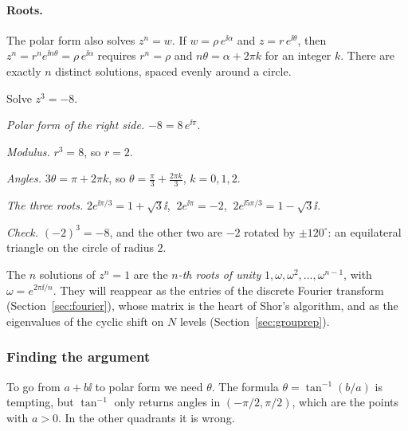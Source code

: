 \paragraph{Roots.} The polar form also solves $z^n=w$. If $w=\rho\,e^{\ii\alpha}$ and $z=r\,e^{\ii\theta}$, then $z^n=r^ne^{\ii n\theta}=\rho\,e^{\ii\alpha}$ requires $r^n=\rho$ and $n\theta=\alpha+2\pi k$ for an integer $k$. There are exactly $n$ distinct solutions, spaced evenly around a circle.

\begin{example}[Roots of $-8$]\label{ex:roots}
  Solve $z^3=-8$.
\end{example}
\begin{solution}
  \begin{steps}
    \item \emph{Polar form of the right side.} $-8=8\,e^{\ii\pi}$.
    \item \emph{Modulus.} $r^3=8$, so $r=2$.
    \item \emph{Angles.} $3\theta=\pi+2\pi k$, so $\theta=\frac\pi3+\frac{2\pi k}{3}$, $k=0,1,2$.
    \item \emph{The three roots.} $2e^{\ii\pi/3}=1+\sqrt3\ii$, $\ 2e^{\ii\pi}=-2$, $\ 2e^{\ii5\pi/3}=1-\sqrt3\ii$.
    \item \emph{Check.} $(-2)^3=-8$, and the other two are $-2$ rotated by $\pm120^\circ$: an equilateral triangle on the circle of radius $2$.
  \end{steps}
\end{solution}

\begin{lookahead}
  The $n$ solutions of $z^n=1$ are the \emph{$n$-th roots of unity} $1,\omega,\omega^2,\dots,\omega^{n-1}$, with $\omega=e^{2\pi\ii/n}$. They will reappear as the entries of the discrete Fourier transform (Section~\ref{sec:fourier}), whose matrix is the heart of Shor's algorithm, and as the eigenvalues of the cyclic shift on $N$ levels (Section~\ref{sec:grouprep}).
\end{lookahead}

\subsubsection*{Finding the argument}

To go from $a+b\ii$ to polar form we need $\theta$. The formula $\theta=\tan^{-1}(b/a)$ is tempting, but $\tan^{-1}$ only returns angles in $(-\pi/2,\pi/2)$, which are the points with $a>0$. In the other quadrants it is wrong.

